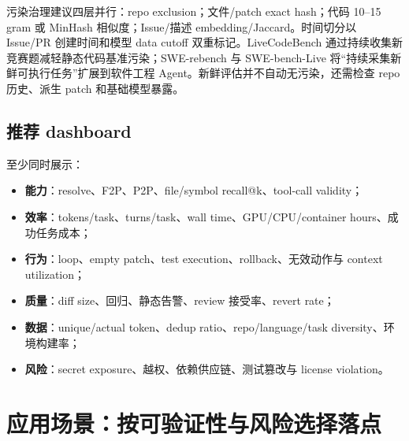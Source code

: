 \documentclass[10pt,a4paper,UTF8,fontset=none]{ctexart}
\begin{document}
污染治理建议四层并行：repo exclusion；文件/patch exact hash；代码 10--15 gram 或 MinHash 相似度；Issue/描述 embedding/Jaccard。时间切分以 Issue/PR 创建时间和模型 data cutoff 双重标记。LiveCodeBench 通过持续收集新竞赛题减轻静态代码基准污染\cite{jain2024livecodebench}；SWE-rebench 与 SWE-bench-Live 将“持续采集新鲜可执行任务”扩展到软件工程 Agent\cite{badertdinov2025swerebench,microsoft2026swebenchlive}。新鲜评估并不自动无污染，还需检查 repo 历史、派生 patch 和基础模型暴露。

\subsection{推荐 dashboard}

至少同时展示：

\begin{itemize}
  \item \textbf{能力}：resolve、F2P、P2P、file/symbol recall@k、tool-call validity；
  \item \textbf{效率}：tokens/task、turns/task、wall time、GPU/CPU/container hours、成功任务成本；
  \item \textbf{行为}：loop、empty patch、test execution、rollback、无效动作与 context utilization；
  \item \textbf{质量}：diff size、回归、静态告警、review 接受率、revert rate；
  \item \textbf{数据}：unique/actual token、dedup ratio、repo/language/task diversity、环境构建率；
  \item \textbf{风险}：secret exposure、越权、依赖供应链、测试篡改与 license violation。
\end{itemize}

\section{应用场景：按可验证性与风险选择落点}
\end{document}
